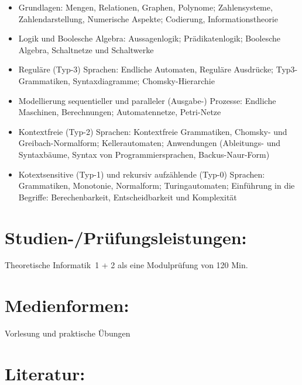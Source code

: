 \begin{itemize}
\tightlist
\item
  Grundlagen: Mengen, Relationen, Graphen, Polynome; Zahlensysteme,
  Zahlendarstellung, Numerische Aspekte; Codierung, Informationstheorie
\item
  Logik und Boolesche Algebra: Aussagenlogik; Prädikatenlogik; Boolesche
  Algebra, Schaltnetze und Schaltwerke
\item
  Reguläre (Typ-3) Sprachen: Endliche Automaten, Reguläre Ausdrücke;
  Typ3-Grammatiken, Syntaxdiagramme; Chomsky-Hierarchie
\item
  Modellierung sequentieller und paralleler (Ausgabe-) Prozesse:
  Endliche Maschinen, Berechnungen; Automatennetze, Petri-Netze
\item
  Kontextfreie (Typ-2) Sprachen: Kontextfreie Grammatiken, Chomsky- und
  Greibach-Normalform; Kellerautomaten; Anwendungen (Ableitungs- und
  Syntaxbäume, Syntax von Programmiersprachen, Backus-Naur-Form)
\item
  Kotextsensitive (Typ-1) und rekursiv aufzählende (Typ-0) Sprachen:
  Grammatiken, Monotonie, Normalform; Turingautomaten; Einführung in die
  Begriffe: Berechenbarkeit, Entscheidbarkeit und Komplexität
\end{itemize}

\section*{Studien-/Prüfungsleistungen:}\label{studien-pruxfcfungsleistungen-22}

Theoretische Informatik~1 + 2 als eine Modulprüfung von 120 Min.

\section*{Medienformen:}\label{medienformen-15}

Vorlesung und praktische Übungen

\section*{Literatur:}\label{literatur-20}

